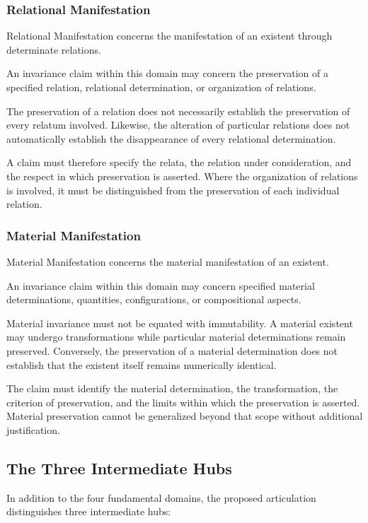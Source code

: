 \subsubsection{Relational Manifestation}

Relational Manifestation concerns the manifestation
of an existent through determinate relations.

An invariance claim within this domain may
concern the preservation of a specified relation,
relational determination, or organization of
relations.

The preservation of a relation does not
necessarily establish the preservation of
every relatum involved. Likewise, the alteration
of particular relations does not automatically
establish the disappearance of every relational
determination.

A claim must therefore specify the relata,
the relation under consideration, and the
respect in which preservation is asserted.
Where the organization of relations is involved,
it must be distinguished from the preservation
of each individual relation.

\subsubsection{Material Manifestation}

Material Manifestation concerns the material
manifestation of an existent.

An invariance claim within this domain may
concern specified material determinations,
quantities, configurations, or compositional
aspects.

Material invariance must not be equated with
immutability. A material existent may undergo
transformations while particular material
determinations remain preserved. Conversely,
the preservation of a material determination
does not establish that the existent itself
remains numerically identical.

The claim must identify the material determination,
the transformation, the criterion of preservation,
and the limits within which the preservation
is asserted. Material preservation cannot
be generalized beyond that scope without
additional justification.

\subsection{The Three Intermediate Hubs}

In addition to the four fundamental domains,
the proposed articulation distinguishes three
intermediate hubs:


